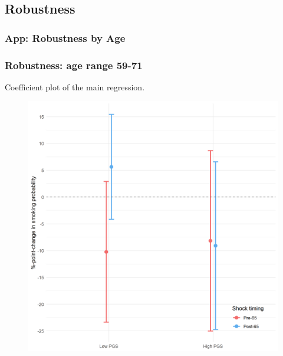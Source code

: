 \documentclass[10pt,compress,xcolor=dvipsnames,aspectratio=169]{beamer}    %
\newcounter{ex}
\newcommand{\1}[1]{\mathrm{1\hspace*{-2.5pt}l}[#1]}	%
\begin{document}
\subsection{Robustness}
%
%

\subsubsection{App: Robustness by Age}
\begin{frame}
\frametitle{Robustness: age range 59-71}
Coefficient plot of the main regression.
\begin{figure}[hbtp]

\centering
\includegraphics[height=0.8\textheight]{../../3_output/shock_effects/robustness_5971_100_cv.png}
\label{fig:coeffplot59-71}
\end{figure}
\hyperlink{frame:robustness}{}
\end{frame}
\end{document}
